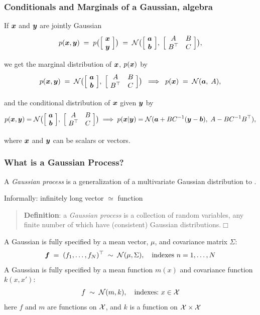 \begin{frame}
\frametitle{Conditionals and Marginals of a Gaussian, algebra}

If $\bm x$ and $\bm y$ are jointly Gaussian
\[
p(\bm x,\bm y)\;=\;p\big(\Big[\!\begin{array}{c}\bm x\\ \bm y\end{array}
\!\Big]\big)\;=\;{\cal N}\big(\Big[\!\begin{array}{c}\bm a \\ \bm b\end{array}\!\Big],
\;\Big[\!\begin{array}{cc}A & B \\ B^\top & C\end{array}\!\Big]\big),
\]

we get the marginal distribution of $\bm x$, $p(\bm x)$ by
\[
p(\bm x,\bm y)\;=\;{\cal N}\big(\Big[\!\begin{array}{c}\bm a \\ \bm b
\end{array}\!\Big],
\;\Big[\!\begin{array}{cc}A & B \\ B^\top & C\end{array}\!\Big]\big)
\;\;\Longrightarrow\;\;p(\bm x)\;=\;{\cal N}(\bm a,\;A),
\]

and the conditional distribution of $\bm x$ given $\bm y$ by
\[
p(\bm x,\bm y)={\cal N}\big(\Big[\!\begin{array}{c}\bm a \\ \bm b
\end{array}\!\Big],
\;\Big[\!\begin{array}{cc}A & B \\ B^\top & C\end{array}\!\Big]\big)
\;\Longrightarrow\;p(\bm x|\bm y)={\cal N}(\bm a+BC^{-1}(\bm y-\bm b),\;
A-BC^{-1}B^\top),
\]

where $\bm x$ and $\bm y$ can be scalars or vectors.
\end{frame}


\begin{frame}
\frametitle{What is a Gaussian Process?}

A \emph{Gaussian process} is a generalization of a multivariate Gaussian
distribution to .

Informally: infinitely long vector $\simeq$ function

\begin{quote}
{\bf Definition}: a \emph{Gaussian process} is a collection of random
variables, any finite number of which have (consistent) Gaussian
distributions.\hfill$\Box$
\end{quote}

A Gaussian  is fully specified by a mean vector, $\mu$, and
covariance matrix $\Sigma$:
\[
\bm f\;=\;(f_1,\ldots,f_N)^\top\;\sim\;{\cal N}(\mu,\Sigma),
\text{\ \ \ indexes\ } n=1,\ldots,N
\]
A Gaussian  is fully specified by a mean function $m(x)$ and
covariance function $k(x,x')$:
\[
f\;\sim\;{\cal N}(m,k), \text{\ \ \ indexes:\ }x \in
{\cal X}
\]
here $f$ and $m$ are functions on ${\cal X}$, and $k$ is a function on
${\cal X} \times {\cal X}$
\end{frame}


